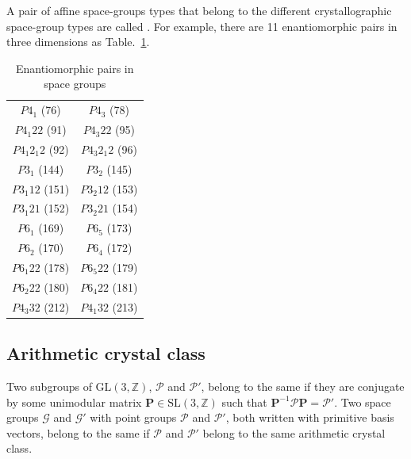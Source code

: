A pair of affine space-groups types that belong to the different crystallographic space-group types are called .
For example, there are 11 enantiomorphic pairs in three dimensions as Table.~\ref{table:enantiomorphic-pairs-3d}.

\begin{table}[htb]
  \centering
  \caption{Enantiomorphic pairs in space groups}
  \label{table:enantiomorphic-pairs-3d}
  \begin{tabular}[h]{cc}
    \hline\hline
    $P 4_{1}$ (76)         & $P 4_{3}$ (78) \\
    $P 4_{1} 2 2$ (91)     & $P 4_{3} 2 2$ (95) \\
    $P 4_{1} 2_{1} 2$ (92) & $P 4_{3} 2_{1} 2$ (96) \\
    $P 3_{1}$ (144)        & $P 3_{2}$ (145) \\
    $P 3_{1} 1 2$ (151)    & $P 3_{2} 1 2$ (153) \\
    $P 3_{1} 2 1$ (152)    & $P 3_{2} 2 1$ (154) \\
    $P 6_{1}$ (169)        & $P 6_{5}$ (173) \\
    $P 6_{2}$ (170)        & $P 6_{4}$ (172) \\
    $P 6_{1} 2 2$ (178)    & $P 6_{5} 2 2$ (179) \\
    $P 6_{2} 2 2$ (180)    & $P 6_{4} 2 2$ (181) \\
    $P 4_{3} 3 2$ (212)    & $P 4_{1} 3 2$ (213) \\
    \hline\hline
  \end{tabular}
\end{table}

\subsection{\label{sec:arithmetic-crystal-class}Arithmetic crystal class}

\begin{screen}
  \begin{defn}
    Two subgroups of $\mathrm{GL}(3, \mathbb{Z})$, $\mathcal{P}$ and $\mathcal{P}'$, belong to the same  if they are conjugate by some unimodular matrix $\bm{P} \in \mathrm{SL}(3, \mathbb{Z})$ such that $\bm{P}^{-1} \mathcal{P} \bm{P} = \mathcal{P}'$.
    Two space groups $\mathcal{G}$ and $\mathcal{G}'$ with point groups $\mathcal{P}$ and $\mathcal{P}'$, both written with primitive basis vectors, belong to the same  if $\mathcal{P}$ and $\mathcal{P}'$ belong to the same arithmetic crystal class.
  \end{defn}
\end{screen}


